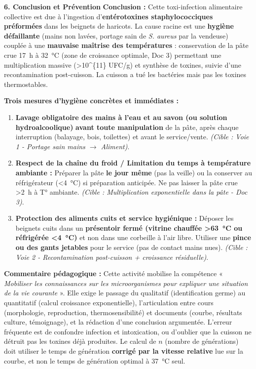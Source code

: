 \documentclass[11pt]{article}
\begin{document}
\begin{exoresolu}
\textbf{6. Conclusion et Prévention}
\textbf{Conclusion :} Cette toxi-infection alimentaire collective est due à l'ingestion d'\textbf{entérotoxines staphylococciques préformées} dans les beignets de haricots. La cause racine est une \textbf{hygiène défaillante} (mains non lavées, portage sain de \textit{S. aureus} par la vendeuse) couplée à une \textbf{mauvaise maîtrise des températures} : conservation de la pâte crue \SI{17}{\hour} à \SI{32}{\celsius} (zone de croissance optimale, Doc 3) permettant une multiplication massive (\textgreater \num{10^{11}} UFC/g) et synthèse de toxines, suivie d'une recontamination post-cuisson. La cuisson a tué les bactéries mais pas les toxines thermostables.

\textbf{Trois mesures d'hygiène concrètes et immédiates :}
\begin{enumerate}
    \item \textbf{Lavage obligatoire des mains à l'eau et au savon (ou solution hydroalcoolique)} \textbf{avant toute manipulation} de la pâte, après chaque interruption (balayage, bois, toilettes) et avant le service/vente. \textit{(Cible : Voie 1 - Portage sain mains $\rightarrow$ Aliment)}.
    \item \textbf{Respect de la chaîne du froid / Limitation du temps à température ambiante :} Préparer la pâte \textbf{le jour même} (pas la veille) ou la conserver au réfrigérateur (\textless \SI{4}{\celsius}) si préparation anticipée. Ne pas laisser la pâte crue \textgreater \SI{2}{\hour} à T° ambiante. \textit{(Cible : Multiplication exponentielle dans la pâte - Doc 3)}.
    \item \textbf{Protection des aliments cuits et service hygiénique :} Déposer les beignets cuits dans un \textbf{présentoir fermé (vitrine chauffée \textgreater \SI{63}{\celsius} ou réfrigérée \textless \SI{4}{\celsius})} et non dans une corbeille à l'air libre. Utiliser une \textbf{pince ou des gants jetables} pour le service (pas de contact mains nues). \textit{(Cible : Voie 2 - Recontamination post-cuisson + croissance résiduelle)}.
\end{enumerate}
\tcblower
\textbf{Commentaire pédagogique :} Cette activité mobilise la compétence « \emph{Mobiliser les connaissances sur les microorganismes pour expliquer une situation de la vie courante} ». Elle exige le passage du qualitatif (identification germe) au quantitatif (calcul croissance exponentielle), l'articulation entre cours (morphologie, reproduction, thermosensibilité) et documents (courbe, résultats culture, témoignage), et la rédaction d'une conclusion argumentée. L'erreur fréquente est de confondre infection et intoxication, ou d'oublier que la cuisson ne détruit pas les toxines déjà produites. Le calcul de $n$ (nombre de générations) doit utiliser le temps de génération \textbf{corrigé par la vitesse relative} lue sur la courbe, et non le temps de génération optimal à \SI{37}{\celsius} seul.
\end{exoresolu}
\end{document}
